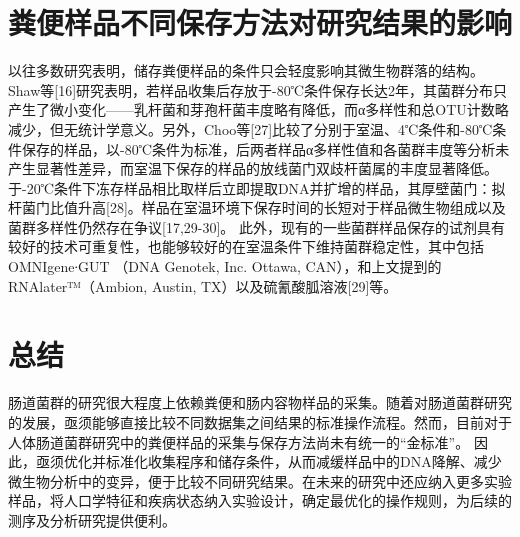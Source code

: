 \section{粪便样品不同保存方法对研究结果的影响}
以往多数研究表明，储存粪便样品的条件只会轻度影响其微生物群落的结构。Shaw等[16]研究表明，若样品收集后存放于-80℃条件保存长达2年，其菌群分布只产生了微小变化——乳杆菌和芽孢杆菌丰度略有降低，而α多样性和总OTU计数略减少，但无统计学意义。另外，Choo等[27]比较了分别于室温、4℃条件和-80℃条件保存的样品，以-80℃条件为标准，后两者样品α多样性值和各菌群丰度等分析未产生显著性差异，而室温下保存的样品的放线菌门双歧杆菌属的丰度显著降低。于-20℃条件下冻存样品相比取样后立即提取DNA并扩增的样品，其厚壁菌门：拟杆菌门比值升高[28]。样品在室温环境下保存时间的长短对于样品微生物组成以及菌群多样性仍然存在争议[17,29-30]。
此外，现有的一些菌群样品保存的试剂具有较好的技术可重复性，也能够较好的在室温条件下维持菌群稳定性，其中包括OMNIgene∙GUT （DNA Genotek, Inc. Ottawa, CAN），和上文提到的RNAlater™（Ambion, Austin, TX）以及硫氰酸胍溶液[29]等。
\section{总结}
肠道菌群的研究很大程度上依赖粪便和肠内容物样品的采集。随着对肠道菌群研究的发展，亟须能够直接比较不同数据集之间结果的标准操作流程。然而，目前对于人体肠道菌群研究中的粪便样品的采集与保存方法尚未有统一的“金标准”。
因此，亟须优化并标准化收集程序和储存条件，从而减缓样品中的DNA降解、减少微生物分析中的变异，便于比较不同研究结果。在未来的研究中还应纳入更多实验样品，将人口学特征和疾病状态纳入实验设计，确定最优化的操作规则，为后续的测序及分析研究提供便利。
